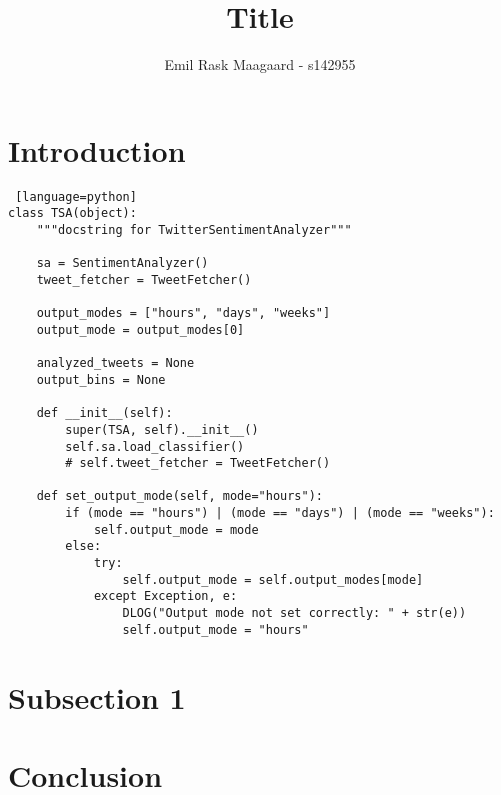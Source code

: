 \documentclass{dtu_report_short}
\title{Title}
\author{Emil Rask Maagaard - s142955}
\begin{document}
\maketitle{}
\titlepage


\section*{Introduction}



\begin{lstlisting} [language=python]
class TSA(object):
    """docstring for TwitterSentimentAnalyzer"""

    sa = SentimentAnalyzer()
    tweet_fetcher = TweetFetcher()

    output_modes = ["hours", "days", "weeks"]
    output_mode = output_modes[0]

    analyzed_tweets = None
    output_bins = None

    def __init__(self):
        super(TSA, self).__init__()
        self.sa.load_classifier()
        # self.tweet_fetcher = TweetFetcher()

    def set_output_mode(self, mode="hours"):
        if (mode == "hours") | (mode == "days") | (mode == "weeks"):
            self.output_mode = mode
        else:
            try:
                self.output_mode = self.output_modes[mode]
            except Exception, e:
                DLOG("Output mode not set correctly: " + str(e))
                self.output_mode = "hours"

\end{lstlisting}


\newpage
\section*{Subsection 1}



\newpage
\section*{Conclusion}

\end{document}

